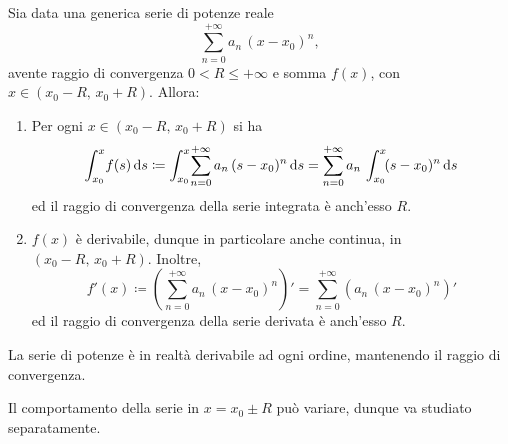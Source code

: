 \documentclass[../../analisi2]{subfiles}
\begin{document}
        \begin{teorema}
            Sia data una generica serie di potenze reale
            \[
                \sum_{n = 0}^{+\infty} a_n \, (x - x_0)^n,
            \]
            avente raggio di convergenza \(0 < R \leqslant +\infty\) e somma \(f(x)\), con \(x \in (x_0 - R, \, x_0 + R)\). Allora:
            \begin{enumerate}
                \item Per ogni \(x \in (x_0 - R, \, x_0 + R)\) si ha
                    \[
                        \int_{x_0}^{x} \! f(s) \, \mathrm{d}s \coloneqq \int_{x_0}^{x} \! \sum_{n = 0}^{+\infty} a_n \, (s - x_0)^n \, \mathrm{d}s = \sum_{n = 0}^{+\infty} a_n \, \int_{x_0}^{x} \! (s - x_0)^n \, \mathrm{d}s
                    \]
                    ed il raggio di convergenza della serie integrata è anch'esso \(R\).
                \item \(f(x)\) è derivabile, dunque in particolare anche continua, in \((x_0 - R, \, x_0 + R)\). Inoltre,
                    \[
                        f'(x) \coloneqq \left(\sum_{n = 0}^{+\infty} a_n \, (x - x_0)^n\right)' = \sum_{n = 0}^{+\infty} \left(a_n \, (x - x_0)^n\right)'
                    \]
                    ed il raggio di convergenza della serie derivata è anch'esso \(R\).
            \end{enumerate}
        \end{teorema}
        \begin{osservazione}
            La serie di potenze è in realtà derivabile ad ogni ordine, mantenendo il raggio di convergenza.
        \end{osservazione}
        \begin{osservazione}
            Il comportamento della serie in \(x = x_0 \pm R\) può variare, dunque va studiato separatamente.
        \end{osservazione}
\end{document}
